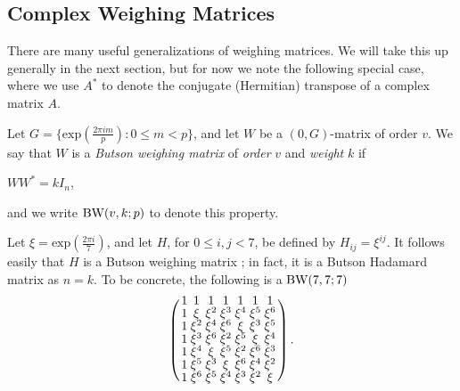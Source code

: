 \documentclass[../../../main]{subfiles}
\begin{document}
 \dinkus
 
 \subsection{Complex Weighing Matrices}
 
 There are many useful generalizations of weighing matrices. We will take this up generally in the next section, but for now we note the following special case, where we use $A^*$ to denote the conjugate (Hermitian) transpose of a complex matrix $A$.
 
 \begin{defin}\label{butson-unitary}
  Let $G = \{\mathrm{exp}(\frac{2\pi im}{p}) : 0 \leq m < p\}$, and let $W$ be a $(0,G)$-matrix of order $v$. We say that $W$ is a {\it Butson weighing matrix} of {\it order} $v$ and {\it weight} $k$ if
  \begin{defenum}
  \item $WW^* = kI_n$,
  \end{defenum}
  and we write $\text{BW}(v,k;p)$ to denote this property.
 \end{defin}
 
 \begin{ex}\label{butson example}
  Let $\xi = \mathrm{exp}(\frac{2\pi i}{7})$, and let $H$, for $0 \leq i,j < 7$, be defined by $H_{ij} = \xi^{ij}$. It follows easily that $H$ is a Butson weighing matrix \cite[see][\S2.5]{circulant-matrices-davis}; in fact, it is a Butson Hadamard matrix as $n = k$. To be concrete, the following is a $\text{BW}(7,7;7)$
  \begin{equation}
  \arraycolsep=1.25pt\def\arraystretch{0.625}
  \left(\begin{array}{ccccccc}
1&1&1&1&1&1&1\\
1&\xi&\xi^{2}&\xi^{3}&\xi^{4}&\xi^{5}&\xi^{6}\\
1&\xi^{2}&\xi^{4}&\xi^{6}&\xi&\xi^{3}&\xi^{5}\\
1&\xi^{3}&\xi^{6}&\xi^{2}&\xi^{5}&\xi&\xi^{4}\\
1&\xi^{4}&\xi&\xi^{5}&\xi^{2}&\xi^{6}&\xi^{3}\\
1&\xi^{5}&\xi^{3}&\xi&\xi^{6}&\xi^{4}&\xi^{2}\\
1&\xi^{6}&\xi^{5}&\xi^{4}&\xi^{3}&\xi^{2}&\xi\\
  \end{array}\right).
  \end{equation}
 \end{ex}
 
\end{document}
